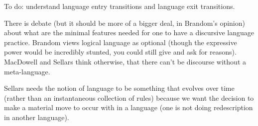 \documentclass[12pt,a4paper]{report}
\begin{document}
To do: understand language entry transitions and language exit transitions.

There is debate (but it should be more of a bigger deal, in Brandom's opinion) about what are the minimal features needed for one to have a discursive language practice. Brandom views logical language as optional (though the expressive power would be incredibly stunted, you could still give and ask for reasons). MacDowell and Sellars think otherwise, that there can't be discourse without a meta-language.

Sellars needs the notion of language to be something that evolves over time (rather than an instantaneous collection of rules) because we want the decision to make a material move to occur with in a language (one is not doing redescription in another language).
\end{document}
